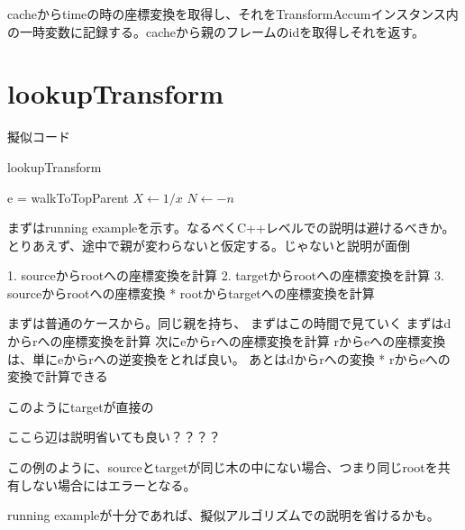 \documentclass[a4paper]{jreport}	%
\begin{document}
cacheからtimeの時の座標変換を取得し、それをTransformAccumインスタンス内の一時変数に記録する。cacheから親のフレームのidを取得しそれを返す。	

\section{lookupTransform}


擬似コード

\begin{algorithm}[H]
	\caption{lookupTransform}
	\begin{algorithmic}
	\STATE e = walkToTopParent
	\STATE $X \leftarrow 1 / x$
    \STATE $N \leftarrow -n$
    \ENDIF
	\end{algorithmic}
\end{algorithm}


まずはrunning exampleを示す。なるべくC++レベルでの説明は避けるべきか。
とりあえず、途中で親が変わらないと仮定する。じゃないと説明が面倒

1. sourceからrootへの座標変換を計算
2. targetからrootへの座標変換を計算
3. sourceからrootへの座標変換 * rootからtargetへの座標変換を計算

まずは普通のケースから。同じ親を持ち、
%
まずはこの時間で見ていく
まずはdからrへの座標変換を計算
次にeからrへの座標変換を計算
rからeへの座標変換は、単にeからrへの逆変換をとれば良い。
あとはdからrへの変換 * rからeへの変換で計算できる


このようにtargetが直接の

ここら辺は説明省いても良い？？？？

この例のように、sourceとtargetが同じ木の中にない場合、つまり同じrootを共有しない場合にはエラーとなる。


running exampleが十分であれば、擬似アルゴリズムでの説明を省けるかも。
\end{document}
